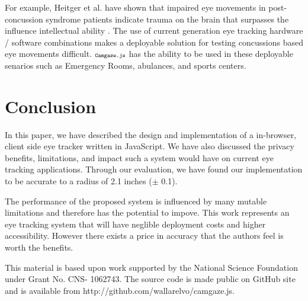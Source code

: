 \documentclass[annual]{acmsiggraph}
\newcommand{\Acronym}[1]{\ensuremath{{\small{\texttt{#1}}}}}
\newcommand{\Name}{\Acronym{Camgaze.js}} \newcommand{\False}{\Constant{false}}
\newcommand{\Constant}[1]{\ensuremath{\small{\texttt{#1}}}}
\begin{document}
For example, Heitger et al. have shown that impaired eye movements in
post-concussion syndrome patients indicate trauma on the brain that surpasses
the influence intellectual ability \cite{Heitger2009}. The use of current
generation eye tracking hardware / software combinations makes a deployable
solution for testing concussions based eye movements difficult. $\Name$ has the
ability to be used in these deployable senarios such as Emergency Rooms,
abulances, and sports centers.

\section{Conclusion}

In this paper, we have described the design and implementation of a in-browser,
client side eye tracker written in JavaScript. We have also discussed the
privacy benefits, limitations, and impact such a system would have on current
eye tracking applications. Through our evaluation, we have found our
implementation to be accurate to a radius of 2.1 inches ($\pm$ 0.1).

The performance of the proposed system is influenced by many mutable
limitations and therefore has the potential to impove. This work represents an
eye tracking system that will have neglible deployment costs and higher
accessibility. However there exists a price in accuracy that the authors feel
is worth the benefits.

This material is based upon work supported by the National Science Foundation
under Grant No. CNS- 1062743. The source code is made public on GitHub site and
is available from http://github.com/wallarelvo/camgaze.js.



\end{document}
